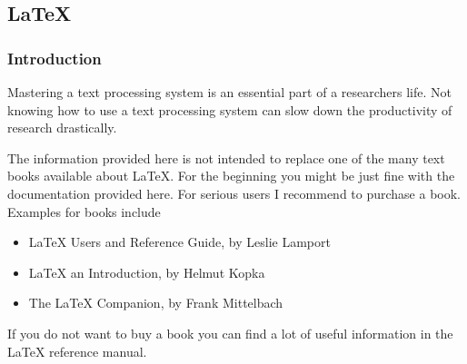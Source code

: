 \subsection{LaTeX}
\label{\detokenize{lesson/doc/latex:latex}}\label{\detokenize{lesson/doc/latex::doc}}

\subsubsection{Introduction}
\label{\detokenize{lesson/doc/latex:introduction}}
Mastering a text processing system is an essential part of a researchers
life. Not knowing how to use a text processing system can slow down the
productivity of research drastically.

The information provided here is not intended to replace one of the many
text books available about LaTeX. For the beginning you might be just
fine with the documentation provided here. For serious users I recommend
to purchase a book. Examples for books include
\begin{itemize}
\item {} 
LaTeX Users and Reference Guide, by Leslie Lamport

\item {} 
LaTeX an Introduction, by Helmut Kopka

\item {} 
The LaTeX Companion, by Frank Mittelbach

\end{itemize}

If you do not want to buy a book you can find a lot of useful
information in the LaTeX reference manual.


